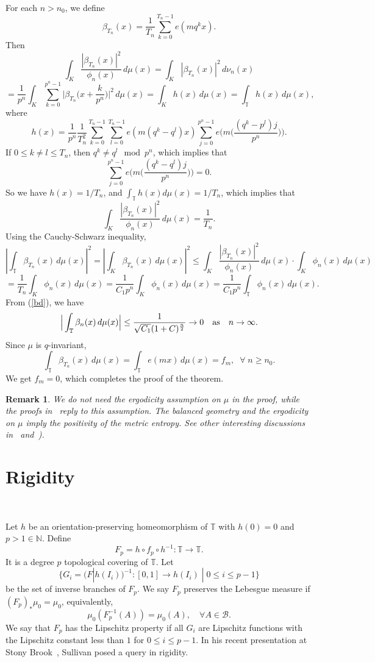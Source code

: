 \documentclass[11pt]{amsart}
\newtheorem{remark}{Remark}
\theoremstyle{definition}
\def\m{\mu}
\def\T{\mathbb{T}}
\begin{document}
For each $n>n_{0}$, we define
$$
\beta_{T_{n}} (x)=\frac{1}{T_{n}}\sum_{k=0}^{T_{n}-1}e(mq^kx).
$$
Then 
$$
 \int_{K}\frac{|\beta_{T_{n}}(x)|^2}{\phi_n(x)}\,d\mu(x) = \int_{K} |\beta_{T_{n}}(x)|^2\,d\nu_n(x)
$$
$$
=\frac{1}{p^{n}} \int_{K} \sum_{k=0}^{p^{n}-1} \Big| \beta_{T_{n}}\Big(x+\frac{k}{p^{n}}\Big)\Big|^2\,d\mu(x)=\int_{K} h(x)\,d\mu(x)=\int_{\T}h(x)\,d\m(x),
$$
where
$$
h(x)=\frac{1}{p^{n}} \frac{1}{T_{n}^2}\sum_{k=0}^{T_{n}-1}\sum_{l=0}^{T_{n}-1}e(m(q^k-q^l)x)\sum_{j=0}^{p^n-1}e\Big(m\Big(\frac{(q^k-p^l)j}{p^{n}}\Big) \Big).
$$
If $0\leq k\neq l\leq T_{n}$, then $q^k\neq q^l\mod p^n$, which implies that 
$$
\sum_{j=0}^{p^n-1}e\Big(m\Big( \frac{(q^k-q^l)j}{p^{n}}\Big)\Big)=0.
$$
So we have $h(x)=1/T_{n}$, and $\int_{\T} h(x)d\mu(x)=1/T_{n}$, which  implies that 
$$
\int_{K}\frac{|\beta_{T_{n}}(x)|^2}{\phi_n(x)}\,d\mu(x) = \frac{1}{T_{n}}.
$$
Using the Cauchy-Schwarz inequality, 
$$
\left|\int_{\T} \beta_{T_n}(x)\,d\mu(x)\right|^2=\left|\int_{K} \beta_{T_n}(x)\,d\mu(x)\right|^2 \leq\int_{K}\frac{|\beta_{T_n}(x)|^2}{\phi_n(x)}\,d\mu(x)\cdot\int_{K}\phi_n(x)\,d\mu(x)
$$
$$
=\frac{1}{T_n}\int_{K}\phi_n(x)\,d\mu(x) =\frac{1}{C_{1}p^{n}} \int_{K}\phi_n(x)\,d\mu(x)=\frac{1}{C_{1}p^{n}} \int_{\T}\phi_n(x)\,d\mu(x).
$$
From (\ref{bd}), we have 
$$
\Big| \int_{\T} \beta_n(x)\,d\mu(x)\Big| \leq \frac{1}{\sqrt{C_{1}}(1+C)^{\frac{n}{2}}}\to 0 \quad \hbox{as} \quad n\to \infty.
$$
Since $\m$ is $q$-invariant, 
$$
\int_{\T} \beta_{T_n}(x)\,d\mu(x)=\int_\T e(mx)\,d\mu(x)=f_{m}, \;\; \forall \; n\geq n_{0}.
$$ 
We get $f_{m}=0$, 
which completes the proof of the theorem.

\medskip
\begin{remark}
We do not need the ergodicity assumption on $\m$ in the proof, while the proofs in~\cite{R,J,H} reply to this assumption. 
The balanced geometry and the ergodicity on $\m$ imply the positivity of the metric entropy. See other interesting discussions  in~\cite[Chapter 9]{ELW} and~\cite{AA}).
 \end{remark}
 
 \section{\bf Rigidity}~\label{rsect}

Let $h$ be an orientation-preserving homeomorphism of $\mathbb{T}$ with $h(0)=0$ and $p>1\in \mathbb{N}$. Define
\[
F_{p}= h\circ f_{p}\circ h^{-1}: \mathbb{T}\to \mathbb{T}.
\]
It is a degree $p$ topological covering of $\mathbb{T}$. Let 
\[
\{ G_{i} =(F|h(I_{i}))^{-1}: [0,1] \to h(I_{i})\;|\; 0\leq i\leq p-1\}
\] 
be the set of inverse branches of $F_{p}$. We say $F_{p}$ preserves the Lebesgue measure if $(F_{p})_{*}\mu_{0}=\mu_{0}$, equivalently, 
\[
\mu_{0} (F_{p}^{-1}(A)) =\mu_{0} (A), \quad \forall A\in \mathcal{B}.
\]
We say that $F_{p}$ has the Lipschitz property if all $G_{i}$ are Lipschitz functions with the Lipschitz constant less than $1$ for $0\leq i\leq p-1$. In his recent presentation at Stony Brook~\cite{S}, Sullivan posed a query in rigidity. 
\end{document}
